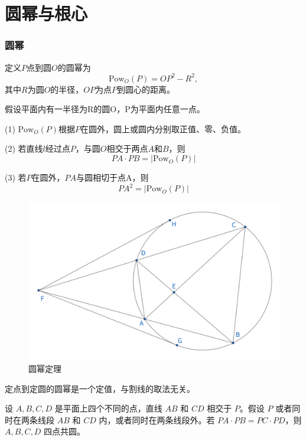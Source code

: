 \part{圆幂与根心}





\section{圆幂}
\begin{definition}[圆幂]
    定义$P$点到圆$O$的圆幂为
    $$\text{Pow}_O(P) = OP^2 - R^2,$$
    其中$R$为圆$O$的半径，$OP$为点$P$到圆心的距离。
\end{definition}


\begin{theorem}[圆幂定理]
    假设平面内有一半径为R的圆O，P为平面内任意一点。
    
    (1) $\text{Pow}_O(P)$根据$P$在圆外，圆上或圆内分别取正值、零、负值。

    (2) 若直线$l$经过点$P$，与圆$O$相交于两点$A$和$B$，则
    $$PA \cdot PB = |\text{Pow}_O(P)|$$

    (3) 若$P$在圆外，$PA$与圆相切于点A，则
    $$PA^2 = |\text{Pow}_O(P)|$$
\end{theorem}
\begin{figure}[H]
    \centering
    \includegraphics[width=0.7\linewidth]{figures/圆幂定理.png}
    \caption{圆幂定理}
\end{figure}
\begin{remark}
    定点到定圆的圆幂是一个定值，与割线的取法无关。
\end{remark}


\begin{theorem}[圆幂逆定理]
    设 $A, B, C, D$ 是平面上四个不同的点，直线 $AB$ 和 $CD$ 相交于 $P$。假设 $P$ 或者同时在两条线段 $AB$ 和 $CD$ 内，或者同时在两条线段外。若 $PA \cdot PB = PC \cdot PD$，则 $A, B, C, D$ 四点共圆。
\end{theorem}

